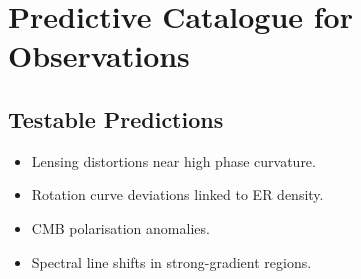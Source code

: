 \chapter{Predictive Catalogue for Observations}

\section{Testable Predictions}
\begin{itemize}
\item Lensing distortions near high phase curvature.
\item Rotation curve deviations linked to ER density.
\item CMB polarisation anomalies.
\item Spectral line shifts in strong-gradient regions.
\end{itemize}

